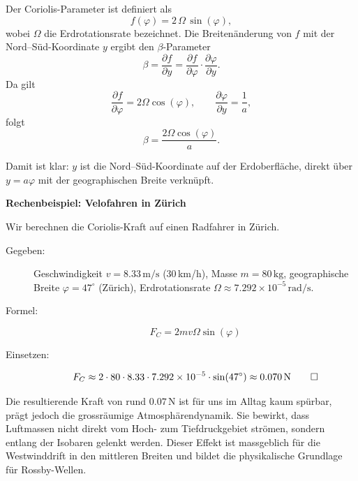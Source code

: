Der Coriolis-Parameter ist definiert als
\begin{equation}
	f(\varphi) = 2 \, \Omega \, \sin(\varphi),
\end{equation}
wobei \(\Omega\) die Erdrotationsrate bezeichnet.
%
Die Breitenänderung von \(f\) mit der Nord–Süd-Koordinate \(y\) ergibt den \(\beta\)-Parameter
%
\begin{equation}
	\beta = \frac{\partial f}{\partial y}
	= \frac{\partial f}{\partial \varphi} \cdot \frac{\partial \varphi}{\partial y}.
\end{equation}
Da gilt
\begin{equation}
	\frac{\partial f}{\partial \varphi} = 2 \Omega \cos(\varphi),
	\qquad
	\frac{\partial \varphi}{\partial y} = \frac{1}{a},
\end{equation}
folgt
\begin{equation}
	\beta = \frac{2 \Omega \cos(\varphi)}{a}.
\end{equation}

Damit ist klar: \(y\) ist die Nord–Süd-Koordinate auf der Erdoberfläche, direkt
über \(y = a \varphi\) mit der geographischen Breite verknüpft.

\begin{beispiel}\textbf{Rechenbeispiel: Velofahren in Zürich}
%

\noindent
Wir berechnen die Coriolis-Kraft auf einen Radfahrer in Zürich.
%

\begin{description}
\item[Gegeben:] Geschwindigkeit \(v = 8.33\,\mathrm{m/s}\) (30\,km/h), Masse \(m =
      80\,\mathrm{kg}\), geographische Breite \(\varphi = 47^\circ\) (Zürich),
      Erdrotationsrate \(\Omega \approx 7.292 \times 10^{-5}\,\mathrm{rad/s}\).
\item[Formel:]
      \[
	      F_C = 2mv\Omega\sin(\varphi)
      \]
\item[Einsetzen:]
      \[
	      F_C \approx 2 \cdot 80 \cdot 8.33 \cdot 7.292 \times 10^{-5} \cdot \sin(47^\circ)
	      \approx 0.070\,\mathrm{N}
\qedhere
      \]
\end{description}

\end{beispiel}
\noindent
Die resultierende Kraft von rund \(0.07\,\mathrm{N}\) ist für uns im Alltag kaum spürbar, prägt jedoch die grossräumige Atmosphärendynamik.
Sie bewirkt, dass Luftmassen nicht direkt vom Hoch- zum Tiefdruckgebiet strömen, sondern entlang der Isobaren gelenkt werden.
Dieser Effekt ist massgeblich für die Westwinddrift in den mittleren Breiten und bildet die physikalische Grundlage für Rossby-Wellen.

